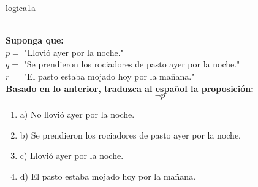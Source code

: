 \documentclass{article}
\begin{document}
\begin{question}{4}{logica}{1}{a}{%
\\\textbf{Suponga que:}\\
\(p =\) "Llovió ayer por la noche."\\
\(q =\) "Se prendieron los rociadores de pasto ayer por la noche."\\
\(r =\) "El pasto estaba mojado hoy por la mañana."\\
\textbf{Basado en lo anterior, traduzca al español la proposición:}\\
$$\neg p$$

\begin{enumerate}
    \item a) No llovió ayer por la noche.
    \item b) Se prendieron los rociadores de pasto ayer por la noche.
    \item c) Llovió ayer por la noche.
    \item d) El pasto estaba mojado hoy por la mañana.
\end{enumerate}
}
\end{question}
\end{document}
